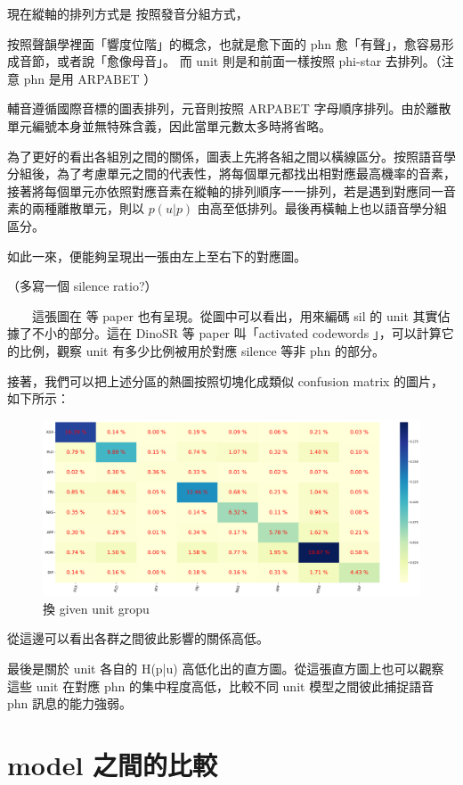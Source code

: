 現在縱軸的排列方式是
             按照發音分組方式，

按照聲韻學裡面「響度位階」的概念，也就是愈下面的 phn 愈「有聲」，愈容易形成音節，或者說「愈像母音」。
而 unit 則是和前面一樣按照 phi-star 去排列。（注意 phn 是用  ARPABET ）
             
             輔音遵循國際音標的圖表排列，元音則按照 ARPABET  字母順序排列。由於離散單元編號本身並無特殊含義，因此當單元數太多時將省略。

        為了更好的看出各組別之間的關係，圖表上先將各組之間以橫線區分。按照語音學分組後，為了考慮單元之間的代表性，將每個單元都找出相對應最高機率的音素，接著將每個單元亦依照對應音素在縱軸的排列順序一一排列，若是遇到對應同一音素的兩種離散單元，則以 \(p(u|p) \) 由高至低排列。最後再橫軸上也以語音學分組區分。

        如此一來，便能夠呈現出一張由左上至右下的對應圖。


（多寫一個 silence ratio?）


　　這張圖在 等 paper 也有呈現。從圖中可以看出，用來編碼 sil 的 unit 其實佔據了不小的部分。這在 DinoSR 等 paper 叫「activated codewords 」，可以計算它的比例，觀察 unit 有多少比例被用於對應 silence 等非 phn 的部分。

  接著，我們可以把上述分區的熱圖按照切塊化成類似 confusion matrix 的圖片，如下所示：

  \begin{figure}
      \centering
      \includegraphics[width=0.5\linewidth]{figures/fakeconf.png}
      \caption{換 given unit gropu}
      \label{fig:enter-label}
  \end{figure}

從這邊可以看出各群之間彼此影響的關係高低。

最後是關於 unit 各自的 H(p|u) 高低化出的直方圖。從這張直方圖上也可以觀察這些 unit 在對應 phn 的集中程度高低，比較不同 unit 模型之間彼此捕捉語音 phn 訊息的能力強弱。

\section{model 之間的比較}


